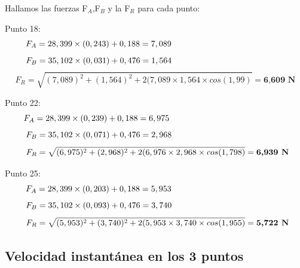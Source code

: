 \documentclass[10pt]{article}
\begin{document}
\vspace{0,2cm}
Hallamos las fuerzas F$_{A}$,F$_{B}$ y la F$_{R}$  para cada punto:

Punto 18:
 \begin{equation*}
    F_{A} = 28,399 \times (0,243) + 0,188 = 7,089
    \textcolor{Blanco}{--------------}
\end{equation*}
\begin{equation*}
    F_{B} = 35,102 \times (0,031) + 0,476 = 1,564
    \textcolor{Blanco}{--------------}
\end{equation*}  
\begin{equation*}
    F_{R} = \sqrt{(7,089)^{2} + (1,564)^{2} + 2(7,089 \times 1,564 \times cos(1,99)} = \textbf{6,609 N}
\end{equation*}
\vspace{-0,2cm}

Punto 22:
 \begin{equation*}
    F_{A} = 28,399 \times (0,239) + 0,188 = 6,975
    \textcolor{Blanco}{-------------..-}
\end{equation*}
\begin{equation*}
    F_{B} = 35,102 \times (0,071) + 0,476 = 2,968
    \textcolor{Blanco}{--------------}
\end{equation*}  
\begin{equation*}
   \textcolor{Blanco}{..} 
    F_{R} = \sqrt{(6,975)^{2} + (2,968)^{2} + 2(6,976 \times 2,968 \times cos(1,798)} = \textbf{6,939 N}
\end{equation*}

Punto 25:
 \begin{equation*}
    F_{A} = 28,399 \times (0,203) + 0,188 = 5,953 \textcolor{Blanco}{--------------}
\end{equation*}
\begin{equation*}
    F_{B} = 35,102 \times (0,093) + 0,476 = 3,740
    \textcolor{Blanco}{--------------}
\end{equation*}  
\begin{equation*}
    \textcolor{Blanco}{..}
    F_{R} = \sqrt{(5,953)^{2} + (3,740)^{2} + 2(5,953 \times 3,740 \times cos(1,955)} = \textbf{5,722 N}
\end{equation*}
\vspace{-3mm}

\subsection{Velocidad instantánea en los 3 puntos}\vspace{2mm}
\end{document}
